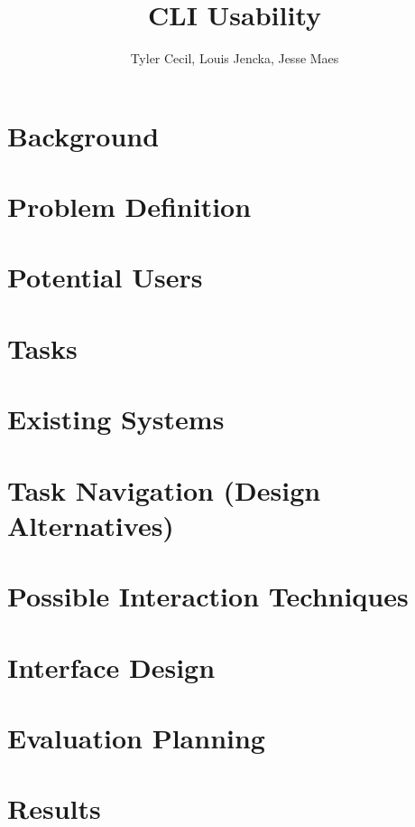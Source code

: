 \documentclass{article}
\title{CLI Usability}
\author{Tyler Cecil, Louis Jencka, Jesse Maes}
\begin{document}
\maketitle{}
\section{Background}
\label{sec:background}


\section{Problem Definition}
\label{sec:problem}


\section{Potential Users}
\label{sec:users}


\section{Tasks}
\label{sec:tasks}


\section{Existing Systems}
\label{sec:existing}


\section{Task Navigation (Design Alternatives)}
\label{sec:tas_nav}


\section{Possible Interaction Techniques}
\label{sec:interact}


\section{Interface Design}
\label{sec:interface}


\section{Evaluation Planning}
\label{sec:eval}


\section{Results}
\label{sec:results}


\end{document}
